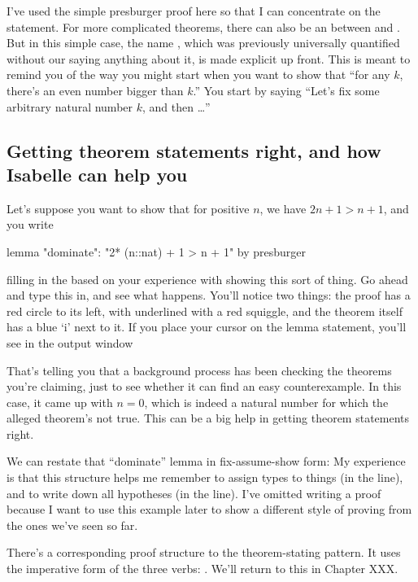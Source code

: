 I've used the simple presburger proof here so that I can concentrate on the statement. For more complicated theorems, there can also be an  between  and . But in this simple case, the name , which was previously universally quantified without our saying anything about it, is made explicit up front. This is meant to remind you of the way you might start when you want to show that ``for any $k$, there's an even number bigger than $k$.'' You start by saying ``Let's fix some arbitrary natural number $k$, and then …'' 

\subsection*{Getting theorem statements right, and how Isabelle can help you}
Let's suppose you want to show that for positive $n$, we have $2n + 1 > n + 1$, and you write

\begin{IS}
lemma "dominate": "2* (n::nat) + 1 > n + 1"
  by presburger    
\end{IS}
\noindent
filling in the  based on your experience with showing this sort of thing.  Go ahead and type this in, and see what happens. 
You'll notice two things: the proof has a red circle to its left, with   underlined with a red squiggle, and the theorem itself has a blue `i' next to it. If you place your cursor on the lemma statement, you'll see in the output window 

That's telling you that a background process has been checking the theorems you're claiming, just to see whether it can find an easy counterexample. In this case, it came up with $n = 0$, which is indeed a natural number for which the alleged theorem's not true. This can be a big help in getting theorem statements right. 

We can restate that ``dominate'' lemma in fix-assume-show form:
My experience is that this structure helps me remember to assign types to things (in the  line), and to write down all hypotheses (in the  line). I've omitted writing a proof because I want to use this example later to show a different style of proving from the ones we've seen so far. 

There's a corresponding proof structure to the theorem-stating  pattern. It uses the imperative form of the three verbs: . We'll return to this in Chapter XXX.

